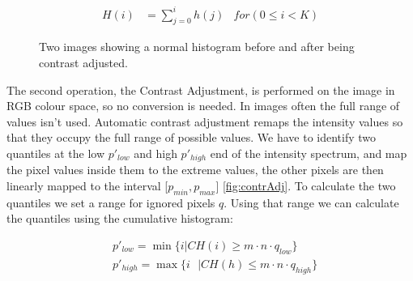 \documentclass[journal,transmag]{IEEEtran}
\begin{document}
\begin{equation}%
\begin{aligned}
H(i) &=  \sum_{j = 0}^{i}h(j) 
& for(0 \leq i < K)
\end{aligned}
\end{equation}
\begin{figure}[h!] %
	\centering
	\caption{Two images showing a normal histogram before and after being contrast adjusted.}
	\label{fig:contrAdjustedHist}
\end{figure}

The second operation, the Contrast Adjustment, is performed on the image in RGB colour space, so no conversion is needed. In images often the full range of values isn't used. Automatic contrast adjustment remaps the intensity values so that they occupy the full range of possible values\cite{automaticContrast}. We have to identify two quantiles at the low $p'_{low}$ and high $p'_{high}$ end of the intensity spectrum, and map the pixel values inside them to the extreme values, the other pixels are then linearly mapped to the interval [$p_{min}, p_{max}$] \ref{fig:contrAdj}. To calculate the two quantiles we set a range for ignored pixels $q$. Using that range we can calculate the quantiles using the cumulative histogram:

\begin{equation} %
\begin{aligned}\label{eq:contrAdjPlowNPhigh}
&p'_{low} = \min\{i | CH(i) \geq m\cdot n \cdot q_{low}\}\\
&p'_{high} = \max\{i \text{ } | CH(h) \leq m\cdot n \cdot q_{high}\}
\end{aligned}
\end{equation}
\end{document}
